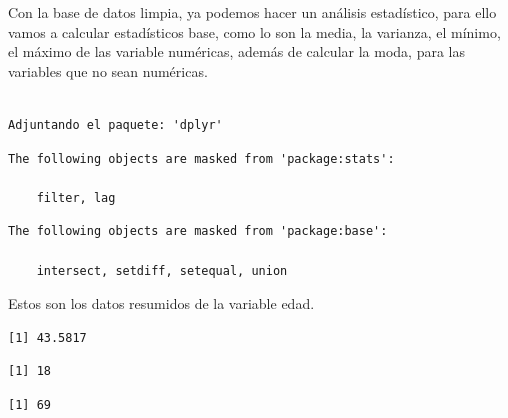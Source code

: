 \documentclass[
  letterpaper,
  DIV=11,
  numbers=noendperiod]{scrreprt}
\newenvironment{Shaded}{\begin{snugshade}}{\end{snugshade}}
\newcommand{\NormalTok}[1]{\textcolor[rgb]{0.00,0.23,0.31}{#1}}
\newcommand{\SpecialCharTok}[1]{\textcolor[rgb]{0.37,0.37,0.37}{#1}}
\begin{document}
Con la base de datos limpia, ya podemos hacer un análisis estadístico,
para ello vamos a calcular estadísticos base, como lo son la media, la
varianza, el mínimo, el máximo de las variable numéricas, además de
calcular la moda, para las variables que no sean numéricas.

\begin{verbatim}

Adjuntando el paquete: 'dplyr'
\end{verbatim}

\begin{verbatim}
The following objects are masked from 'package:stats':

    filter, lag
\end{verbatim}

\begin{verbatim}
The following objects are masked from 'package:base':

    intersect, setdiff, setequal, union
\end{verbatim}

Estos son los datos resumidos de la variable edad.

\begin{Shaded}
\end{Shaded}

\begin{verbatim}
[1] 43.5817
\end{verbatim}

\begin{Shaded}
\end{Shaded}

\begin{verbatim}
[1] 18
\end{verbatim}

\begin{Shaded}
\end{Shaded}

\begin{verbatim}
[1] 69
\end{verbatim}
\end{document}
